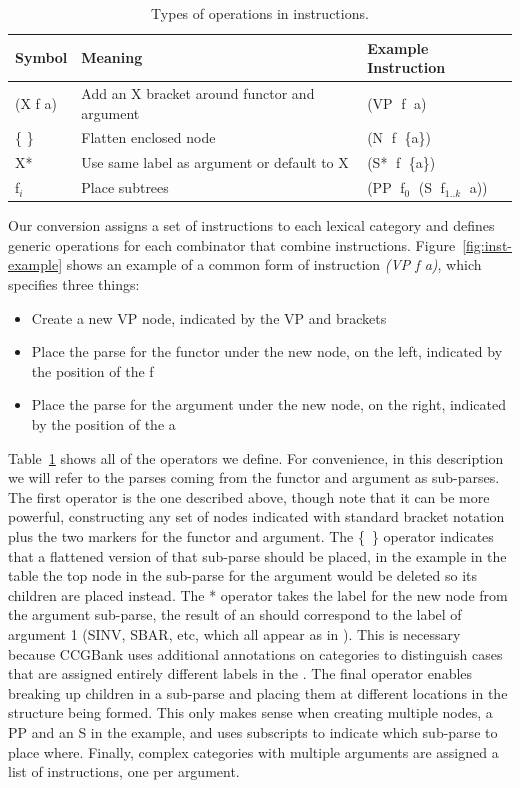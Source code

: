 \begin{table}
\centering
\begin{tabular}{lll}
	\hline
		Symbol & Meaning & Example Instruction \\
	\hline
	\hline
		(X f a) & Add an X bracket around functor and argument & (VP$\;$ f$\;$ a) \\
		\{ \} & Flatten enclosed node & (N$\;$ f$\;$ \{a\}) \\
		X* & Use same label as argument or default to X & (S*$\;$ f$\;$ \{a\}) \\
		f$_i$ & Place subtrees &  (PP$\;$ f$_0$$\;$ (S$\;$ f$_{1..k}$$\;$ a)) \\
	\hline
\end{tabular}
\caption[Types of operations in instructions in our \ccg to \ptb conversion.]{\label{tab:operators}
  Types of operations in instructions.
}
\end{table}

Our conversion assigns a set of instructions to each lexical category and defines generic operations for each combinator that combine instructions.
Figure~\ref{fig:inst-example} shows an example of a common form of instruction \emph{(VP f a)}, which specifies three things:

\begin{itemize}
  \item Create a new VP node, indicated by the VP and brackets
  \item Place the \ptb parse for the functor under the new node, on the left, indicated by the position of the f
  \item Place the \ptb parse for the argument under the new node, on the right, indicated by the position of the a
\end{itemize}

Table~\ref{tab:operators} shows all of the operators we define.
For convenience, in this description we will refer to the parses coming from the functor and argument as sub-parses.
The first operator is the one described above, though note that it can be more powerful, constructing any set of \ptb nodes indicated with standard bracket notation plus the two markers for the functor and argument.
The \{~\} operator indicates that a flattened version of that sub-parse should be placed, in the example in the table the top node in the sub-parse for the argument would be deleted so its children are placed instead.
The * operator takes the label for the new node from the argument sub-parse, \myeg the result of an  should correspond to the label of argument 1 (SINV, SBAR, etc, which all appear as  in \ccg).
This is necessary because CCGBank uses additional annotations on categories to distinguish cases that are assigned entirely different labels in the \ptb.
The final operator enables breaking up children in a sub-parse and placing them at different locations in the structure being formed.
This only makes sense when creating multiple nodes, a PP and an S in the example, and uses subscripts to indicate which sub-parse to place where.
Finally, complex categories with multiple arguments are assigned a list of instructions, one per argument.


